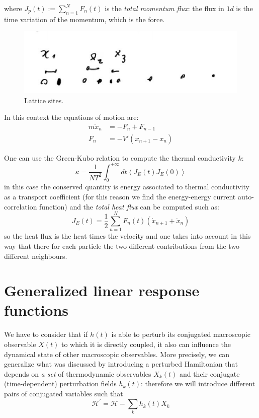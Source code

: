 \documentclass[\main/main.tex]{subfiles}
\begin{document}
where $J_p(t):=\sum_{n=1}^N F_n(t)$ is the \textit{total momentum flux}: the flux in $1d$ is the time variation of the momentum, which is the force. 

\begin{figure}[ht]
    \centering
    \includegraphics[width=0.6\linewidth]{Lectures/Images/latt.jpg}
    \caption{Lattice sites.}
    \label{fig:lattice}
\end{figure}

In this context the equations of motion are:
\begin{align}
    m\ddot{x}_n &=-F_n+F_{n-1} \\
    F_n &= - V'(x_{n+1}-x_{n})
\end{align}

One can use the Green-Kubo relation to compute the thermal conductivity $k$:
\begin{equation}
    \kappa=\frac{1}{N T^{2}} \int_{0}^{+\infty} d t\left\langle J_{E}(t) J_{E}(0)\right\rangle
\end{equation}
in this case the conserved quantity is energy associated to thermal conductivity as a transport coefficient (for this reason we find the energy-energy current auto-correlation function) and the \textit{total heat flux} can be computed such as:
\begin{equation}
    J_{E}(t)=\frac{1}{2} \sum_{n=1}^{N} F_{n}(t)\left(\dot{x}_{n+1}+\dot{x}_{n}\right)
\end{equation}
so the heat flux is the heat times the velocity  and one takes into account in this way that there for each particle the two different contributions from the two different neighbours.

\section{Generalized linear response functions}
We have to consider that if $h(t)$ is able to perturb its conjugated macroscopic observable $X(t)$ to which it is directly coupled, it also can influence the dynamical state of other macroscopic observables. 
More precisely, we can generalize what was discussed by introducing a perturbed Hamiltonian that depends on \textit{a set} of thermodynamic observables $X_{k}(t)$ and their conjugate (time-dependent) perturbation fields $h_{k}(t)$: therefore we will introduce different pairs of conjugated variables such that
\begin{equation}
\mathcal{H}^{\prime}=\mathcal{H}-\sum_{k} h_{k}(t) X_{k}
\end{equation}
\end{document}
